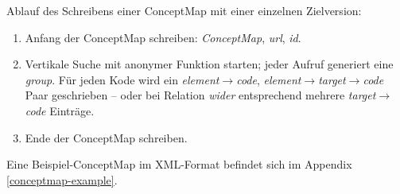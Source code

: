 

Ablauf des Schreibens einer ConceptMap mit einer einzelnen Zielversion: 

\begin{enumerate}
\item Anfang der ConceptMap schreiben: \emph{ConceptMap}, \emph{url}, \emph{id}.
\item Vertikale Suche mit anonymer Funktion starten; jeder Aufruf generiert eine \emph{group}. \newline
Für jeden Kode wird ein \emph{element$\rightarrow$code}, \emph{element$\rightarrow$target$\rightarrow$code} Paar geschrieben -- \newline oder bei Relation \emph{wider} entsprechend mehrere \emph{target$\rightarrow$code} Einträge. 
\item Ende der ConceptMap schreiben.
\end{enumerate}


Eine Beispiel-ConceptMap im XML-Format befindet sich im Appendix \ref{conceptmap-example}.

